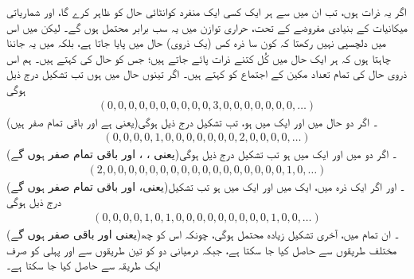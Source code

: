 اگر یہ ذرات  ہوں، تب ان میں سے ہر ایک کسی ایک منفرد کوانٹائی حال کو ظاہر کرے گا، اور شماریاتی میکانیات کے بنیادی مفروضے کے تحت، حراری توازن میں یہ سب برابر محتمل ہوں گے۔ لیکن میں اس میں دلچسپی نہیں رکھتا کہ کون سا ذرہ کس (یک ذروی) حال میں پایا جاتا ہے، بلکہ میں یہ جاننا چاہتا ہوں کہ ہر ایک حال میں کُل کتنے ذرات پائے جاتے ہیں؛ جس کو حال کی   کہتے ہیں۔ ہم اس  ذروی حال کی تمام تعداد مکین کے اجتماع کو  کہتے ہیں۔ اگر تینوں حال  میں ہوں تب تشکیل درج ذیل ہوگی
\begin{align}\label{مساوات_متماثل_تشکیل_الف}
	(0, 0, 0, 0, 0, 0, 0, 0, 0, 0, 3, 0, 0, 0, 0, 0, 0, 0, \dots)
\end{align} 
(یعنی  ہے اور باقی تمام صفر ہیں)۔ اگر دو حال  میں اور ایک  میں ہو، تب تشکیل درج ذیل ہوگی
\begin{align}\label{مساوات_متماثل_تشکیل_ب}
	(0, 0, 0, 0, 1, 0, 0, 0, 0, 0, 0, 0, 2, 0, 0, 0, 0, \dots)
\end{align} 
(یعنی ، ، اور باقی تمام صفر ہوں گے)۔ اگر دو  میں اور ایک  میں ہو تب تشکیل درج ذیل ہوگی
\begin{align}\label{مساوات_متماثل_تشکیل_پ}
	(2, 0, 0, 0, 0, 0, 0, 0, 0, 0, 0, 0, 0, 0, 0, 0, 0, 0, 1, 0, \dots)
\end{align} 
(یعنی،  اور باقی تمام صفر ہوں گے)۔ اور اگر ایک ذرہ  میں، ایک  میں اور ایک  میں ہو تب تشکیل درج ذیل ہوگی
\begin{align}\label{مساوات_متماثل_تشکیل_ت}
	(0, 0, 0, 0, 1, 0, 1, 0, 0, 0, 0, 0, 0, 0, 0, 0, 1, 0, 0, \dots)
\end{align} 
(یعنی  اور باقی صفر ہوں گے)۔ ان تمام میں، آخری تشکیل زیادہ محتمل ہوگی، چونکہ اس کو چھ مختلف طریقوں سے حاصل کیا جا سکتا ہے، جبکہ درمیانی دو کو تین طریقوں سے اور پہلی کو صرف ایک طریقہ سے حاصل کیا جا سکتا ہے۔

